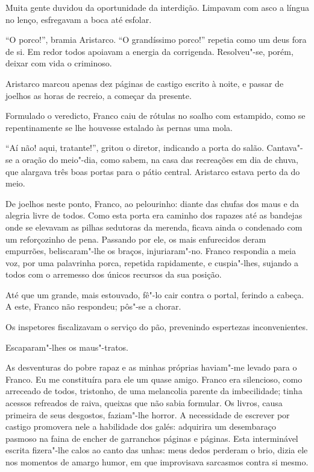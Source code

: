 Muita gente duvidou da
oportunidade da interdição. Limpavam com asco a língua no lenço,
esfregavam a boca até esfolar. 

``O porco!'', bramia Aristarco. ``O grandíssimo porco!'' 
repetia como um deus fora de si. Em redor todos
apoiavam a energia da corrigenda. Resolveu"-se, porém, deixar com vida
o criminoso. 

Aristarco marcou apenas dez páginas de castigo escrito à
noite, e passar de joelhos as horas de recreio, a começar da presente.

Formulado o veredicto, Franco caiu de rótulas no soalho com estampido,
como se repentinamente se lhe houvesse estalado às pernas uma mola. 

``Aí não! aqui, tratante!'', gritou o diretor, indicando a porta do salão.
Cantava"-se a oração do meio"-dia, como sabem, na casa das recreações em
dia de chuva, que alargava três boas portas para o pátio central.
Aristarco estava perto da do meio. 

De joelhos neste ponto, Franco, ao
pelourinho: diante das chufas dos maus e da alegria livre de todos.
Como esta porta era caminho dos rapazes até as bandejas onde se
elevavam as pilhas sedutoras da merenda, ficava ainda o condenado com
um reforçozinho de pena. Passando por ele, os mais enfurecidos deram
empurrões, beliscaram"-lhe os braços, injuriaram"-no. Franco
respondia a meia voz, por uma palavrinha porca, repetida rapidamente, e
cuspia"-lhes, sujando a todos com o arremesso dos únicos recursos da
sua posição. 

Até que um grande, mais estouvado, fê"-lo cair contra o
portal, ferindo a cabeça. A este, Franco não respondeu; pôs"-se a
chorar. 

Os inspetores fiscalizavam o serviço do pão, prevenindo
espertezas inconvenientes. 

Escaparam"-lhes os maus"-tratos. 

As desventuras do pobre rapaz e as minhas próprias haviam"-me levado para
o Franco. Eu me constituíra para ele um quase amigo. Franco era
silencioso, como arreceado de todos, tristonho, de uma melancolia
parente da imbecilidade; tinha acessos refreados de raiva, queixas que
não sabia formular. Os livros, causa primeira de seus desgostos,
faziam"-lhe horror. A necessidade de escrever por castigo promovera
nele a habilidade dos galés: adquirira um desembaraço pasmoso na faina
de encher de garranchos páginas e páginas. Esta interminável escrita
fizera"-lhe calos ao canto das unhas: meus dedos perderam o brio,
dizia ele nos momentos de amargo humor, em que improvisava sarcasmos
contra si mesmo. 


